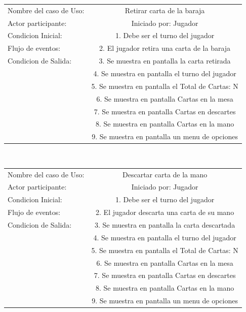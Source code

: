 \documentclass[60pt]{article}
\begin{document}
\begin{center}
    \begin{tabular}{ l | c  }
        Nombre del caso de Uso: & Retirar carta de la baraja \\
        Actor participante: & Iniciado por: Jugador \\\hline
        Condicion Inicial: & 1. Debe ser el turno del jugador    \\
        Flujo de eventos: & 2. El jugador retira una carta de la baraja \\\hline
        Condicion de Salida: & 3. Se muestra en pantalla la carta retirada \\
        & 4. Se muestra en pantalla el turno del jugador \\
        & 5. Se muestra en pantalla el Total de Cartas: N \\
        & 6. Se muestra en pantalla Cartas en la mesa \\
        & 7. Se muestra en pantalla Cartas en descartes \\
        & 8. Se muestra en pantalla Cartas en la mano \\
        & 9. Se muestra en pantalla un menu de opciones \\ 
    \end{tabular} \\
\end{center}
\begin{center}
    \begin{tabular}{ l | c  }
        Nombre del caso de Uso: & Descartar carta de la mano \\
        Actor participante: & Iniciado por: Jugador \\\hline
        Condicion Inicial: & 1. Debe ser el turno del jugador\\
        Flujo de eventos: & 2. El jugador descarta una carta de su mano \\\hline
        Condicion de Salida: & 3. Se muestra en pantalla la carta descartada \\
        & 4. Se muestra en pantalla el turno del jugador \\
        & 5. Se muestra en pantalla el Total de Cartas: N \\
        & 6. Se muestra en pantalla Cartas en la mesa \\
        & 7. Se muestra en pantalla Cartas en descartes \\
        & 8. Se muestra en pantalla Cartas en la mano \\
        & 9. Se muestra en pantalla un menu de opciones \\ 
    \end{tabular} \\
\end{center}
\end{document}
